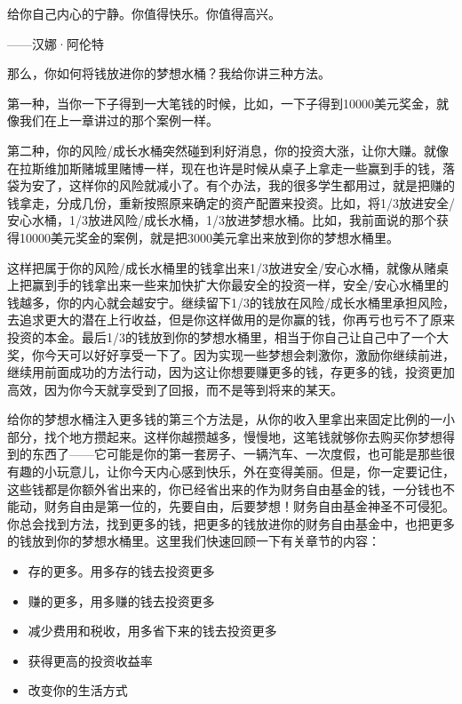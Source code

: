 \begin{BookQuote}
给你自己内心的宁静。你值得快乐。你值得高兴。

\hfill ——汉娜·阿伦特
\end{BookQuote}

那么，你如何将钱放进你的梦想水桶？我给你讲三种方法。

第一种，当你一下子得到一大笔钱的时候，比如，一下子得到10000美元奖金，就像我们在上一章讲过的那个案例一样。

第二种，你的风险/成长水桶突然碰到利好消息，你的投资大涨，让你大赚。就像在拉斯维加斯赌城里赌博一样，现在也许是时候从桌子上拿走一些赢到手的钱，落袋为安了，这样你的风险就减小了。有个办法，我的很多学生都用过，就是把赚的钱拿走，分成几份，重新按照原来确定的资产配置来投资。比如，将1/3放进安全/安心水桶，1/3放进风险/成长水桶，1/3放进梦想水桶。比如，我前面说的那个获得10000美元奖金的案例，就是把3000美元拿出来放到你的梦想水桶里。

这样把属于你的风险/成长水桶里的钱拿出来1/3放进安全/安心水桶，就像从赌桌上把赢到手的钱拿出来一些来加快扩大你最安全的投资一样，安全/安心水桶里的钱越多，你的内心就会越安宁。继续留下1/3的钱放在风险/成长水桶里承担风险，去追求更大的潜在上行收益，但是你这样做用的是你赢的钱，你再亏也亏不了原来投资的本金。最后1/3的钱放到你的梦想水桶里，相当于你自己让自己中了一个大奖，你今天可以好好享受一下了。因为实现一些梦想会刺激你，激励你继续前进，继续用前面成功的方法行动，因为这让你想要赚更多的钱，存更多的钱，投资更加高效，因为你今天就享受到了回报，而不是等到将来的某天。

给你的梦想水桶注入更多钱的第三个方法是，从你的收入里拿出来固定比例的一小部分，找个地方攒起来。这样你越攒越多，慢慢地，这笔钱就够你去购买你梦想得到的东西了——它可能是你的第一套房子、一辆汽车、一次度假，也可能是那些很有趣的小玩意儿，让你今天内心感到快乐，外在变得美丽。但是，你一定要记住，这些钱都是你额外省出来的，你已经省出来的作为财务自由基金的钱，一分钱也不能动，财务自由是第一位的，先要自由，后要梦想！财务自由基金神圣不可侵犯。你总会找到方法，找到更多的钱，把更多的钱放进你的财务自由基金中，也把更多的钱放到你的梦想水桶里。这里我们快速回顾一下有关章节的内容：

\begin{itemize}
\item 存的更多。用多存的钱去投资更多
\item 赚的更多，用多赚的钱去投资更多
\item 减少费用和税收，用多省下来的钱去投资更多
\item 获得更高的投资收益率
\item 改变你的生活方式
\end{itemize}

